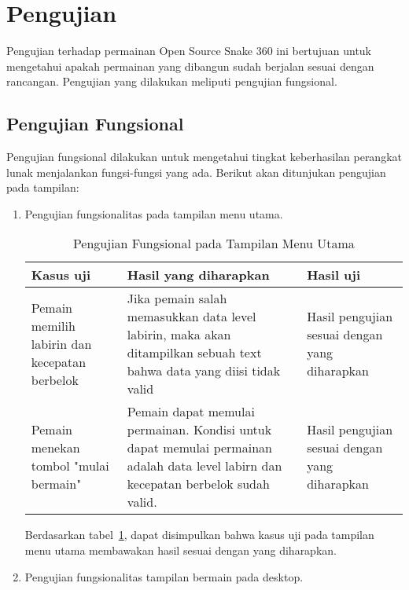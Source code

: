 \section{Pengujian}
Pengujian terhadap permainan Open Source Snake 360 ini bertujuan untuk mengetahui apakah permainan yang dibangun sudah berjalan sesuai dengan rancangan. Pengujian yang dilakukan meliputi pengujian fungsional. 

\subsection{Pengujian Fungsional}
Pengujian fungsional dilakukan untuk mengetahui tingkat keberhasilan perangkat lunak menjalankan fungsi-fungsi yang ada. Berikut akan ditunjukan pengujian pada tampilan: 

\begin{enumerate}
	\item Pengujian fungsionalitas pada tampilan menu utama.
	
	\begin{table}[H]
		\caption{Pengujian Fungsional pada Tampilan Menu Utama} \label{tab:table1}
		\begin{tabular}{| m{4cm} | m{6cm}  | m{4cm} |}
			\hline
			Kasus uji & Hasil yang diharapkan & Hasil uji \\ \hline
			Pemain memilih labirin dan kecepatan berbelok & Jika pemain salah memasukkan data level labirin, maka akan ditampilkan sebuah text bahwa data yang diisi tidak valid & Hasil pengujian sesuai dengan yang diharapkan\\ \hline
			Pemain menekan tombol "mulai bermain" & Pemain dapat memulai permainan. Kondisi untuk dapat memulai permainan adalah data level labirn dan kecepatan berbelok sudah valid. & Hasil pengujian sesuai dengan yang diharapkan\\ \hline
		\end{tabular}
	\end{table}
	
	Berdasarkan tabel~\ref{tab:table1}, dapat disimpulkan bahwa kasus uji pada tampilan menu utama membawakan hasil sesuai dengan yang diharapkan. 
	
	\item Pengujian fungsionalitas tampilan bermain pada desktop.
	

\end{enumerate}
